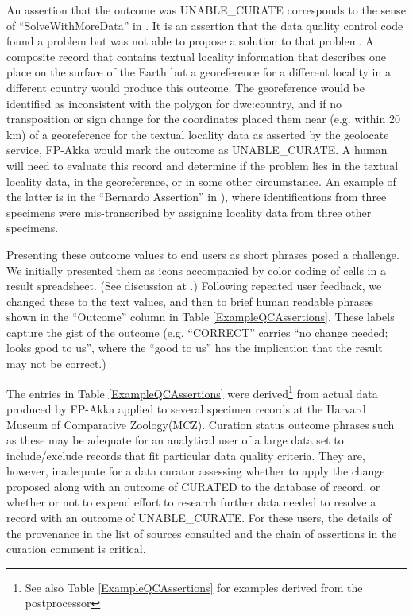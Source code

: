 \documentclass{article}
\begin{document}
An assertion that the outcome was UNABLE\_CURATE corresponds to the sense of ``SolveWithMoreData'' in \citep{morris_semantic_2013}.  It is an assertion that the data quality control code found a problem but was not able to propose a solution to that problem.  
A composite record that contains textual locality information that describes one place on the surface of the Earth but a georeference for a different locality in a different country would produce this outcome.
The georeference would be identified as inconsistent with the polygon for dwc:country, and if no transposition or sign change for the coordinates placed them near (e.g. within 20 km) of a georeference for the textual locality data as asserted by the geolocate service, FP-Akka would mark the outcome as UNABLE\_CURATE.  
A human will need to evaluate this record and determine if the problem lies in the textual locality data, in the georeference, or in some other circumstance.
An example of the latter is in the ``Bernardo Assertion'' in \citep{morris_semantic_2013}), where identifications from three specimens were mis-transcribed by assigning locality data from three other specimens.

Presenting these outcome values to end users as short phrases posed a challenge.
We initially presented them as icons accompanied by color coding of cells in a result spreadsheet. (See discussion at \citep{FPWiki_ResultTypes}.)  Following repeated user feedback, we changed these to the text values, and then to brief human readable phrases shown in the ``Outcome'' 
column in Table \ref{ExampleQCAssertions}. %
These labels capture the gist of the outcome (e.g. ``CORRECT'' carries  ``no change needed; looks good to us'', where the ``good to us'' has the implication 
that the result may not be correct.)

The entries in Table \ref{ExampleQCAssertions} were derived\footnote{See also Table \ref{ExampleQCAssertions} for examples derived from the postprocessor} from actual data produced by FP-Akka applied to several specimen records at the Harvard Museum of Comparative Zoology(MCZ).
Curation status outcome phrases such as these may be adequate for an analytical user of a large data set to include/exclude records that fit particular data quality criteria.  They are, however, inadequate for a data curator assessing whether to apply the change proposed along with an outcome of CURATED to the database of record, or whether or not to expend effort to research further data needed to resolve a record with an outcome of UNABLE\_CURATE.  For these users, the details of the provenance in the list of sources consulted and the chain of assertions in the curation comment is critical.  
\end{document}
